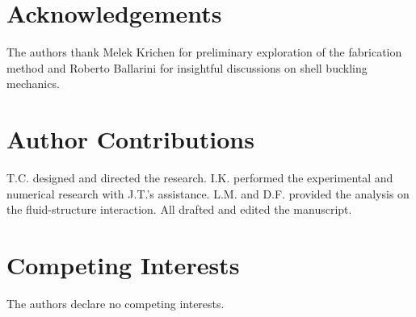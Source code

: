 \documentclass[twocolumn,letter,11pt]{article}
\begin{document}
\section*{Acknowledgements}
The authors thank Melek Krichen for preliminary exploration of the fabrication method and Roberto Ballarini for insightful discussions on shell buckling mechanics. 

\section*{Author Contributions} T.C. designed and directed the research. I.K. performed the experimental and numerical research with J.T.'s assistance. L.M. and D.F. provided the analysis on the fluid-structure interaction. All drafted and edited the manuscript.

\section*{Competing Interests} The authors declare no competing interests.
\end{document}
